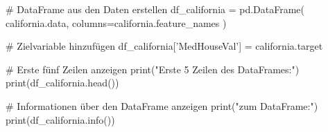 # DataFrame aus den Daten erstellen
df_california = pd.DataFrame(
    california.data, 
    columns=california.feature_names
)

# Zielvariable hinzufügen
df_california['MedHouseVal'] = california.target

# Erste fünf Zeilen anzeigen
print("Erste 5 Zeilen des DataFrames:")
print(df_california.head())

# Informationen über den DataFrame anzeigen
print("\nInformationen zum DataFrame:")
print(df_california.info())